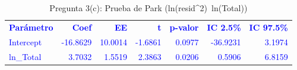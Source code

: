\begin{table}[H]
\centering
\caption{Pregunta 3(c): Prueba de Park (ln(resid\textasciicircum 2)~ln(Total))}
\label{tab:q3c_park}
\begin{tabular}{lrrrrrr}
\rowcolor{blue!10}
\toprule
\rowcolor{blue!20}
\textcolor{blue}{\textbf{Parámetro}} & \textcolor{blue}{\textbf{Coef}} & \textcolor{blue}{\textbf{EE}} & \textcolor{blue}{\textbf{t}} & \textcolor{blue}{\textbf{p-valor}} & \textcolor{blue}{\textbf{IC 2.5\%}} & \textcolor{blue}{\textbf{IC 97.5\%}} \\
\addlinespace
\rowcolor{blue!10}
\textcolor{blue}{Intercept} & \textcolor{blue}{-16.8629} & \textcolor{blue}{10.0014} & \textcolor{blue}{-1.6861} & \textcolor{blue}{0.0977} & \textcolor{blue}{-36.9231} & \textcolor{blue}{3.1974} \\
\rowcolor{blue!10}
\textcolor{blue}{ln\_Total} & \textcolor{blue}{3.7032} & \textcolor{blue}{1.5519} & \textcolor{blue}{2.3863} & \textcolor{blue}{0.0206} & \textcolor{blue}{0.5906} & \textcolor{blue}{6.8159} \\
\bottomrule
\end{tabular}
\end{table}
